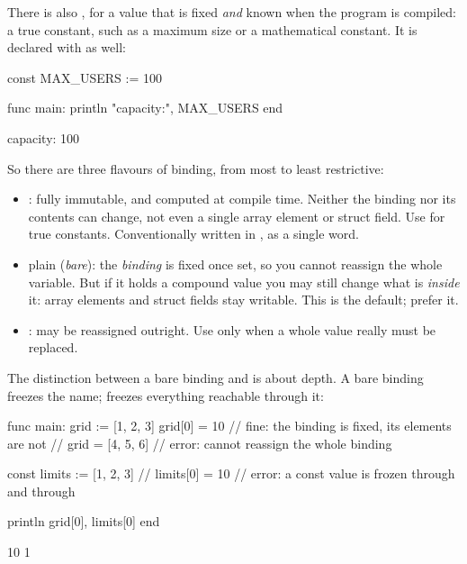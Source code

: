 There is also , for a value that is fixed \emph{and} known when the
program is compiled: a true constant, such as a maximum size or a
mathematical constant. It is declared with \code{:=} as well:

\begin{salamen}
const MAX_USERS := 100

func main:
    println "capacity:", MAX_USERS
end
\end{salamen}

\begin{progout}
capacity: 100
\end{progout}

So there are three flavours of binding, from most to least restrictive:

\begin{itemize}[leftmargin=1.4em]
  \item {}: fully immutable, and computed at compile time. Neither the
        binding nor its contents can change, not even a single array element or
        struct field. Use for true constants. Conventionally written in
        , as a single word.
  \item plain (\emph{bare}): the \emph{binding} is fixed once set, so you cannot
        reassign the whole variable. But if it holds a compound value you may
        still change what is \emph{inside} it: array elements and struct fields
        stay writable. This is the default; prefer it.
  \item {}: may be reassigned outright. Use only when a whole value
        really must be replaced.
\end{itemize}

The distinction between a bare binding and  is about depth. A bare
binding freezes the name;  freezes everything reachable through it:

\begin{salamen}
func main:
    grid := [1, 2, 3]
    grid[0] = 10          // fine: the binding is fixed, its elements are not
    // grid = [4, 5, 6]   // error: cannot reassign the whole binding

    const limits := [1, 2, 3]
    // limits[0] = 10     // error: a const value is frozen through and through

    println grid[0], limits[0]
end
\end{salamen}

\begin{progout}
10 1
\end{progout}

